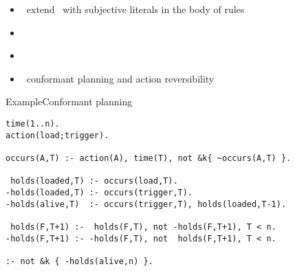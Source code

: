 \begin{frame}{\eclingo}
  \begin{itemize}
  \item {} \ extend \clingo\ with subjective literals in the body of rules
  \item {} \
  \item {} \ \cite{cafagarosc20a}
  \item {} \ conformant planning \cite{cafafa21a} and action reversibility \cite{famoch21a}
  \end{itemize}
\end{frame}
\begin{frame}[fragile]{Example}{Conformant planning}
\begin{lstlisting}[language=clingo,basicstyle=\scriptsize\ttfamily]%,literate={~}{{$\sim$}}1]
time(1..n).
action(load;trigger).

occurs(A,T) :- action(A), time(T), not &k{ ~occurs(A,T) }.

 holds(loaded,T) :- occurs(load,T).
-holds(loaded,T) :- occurs(trigger,T).
-holds(alive,T)  :- occurs(trigger,T), holds(loaded,T-1).

 holds(F,T+1) :-  holds(F,T), not -holds(F,T+1), T < n.
-holds(F,T+1) :- -holds(F,T), not  holds(F,T+1), T < n.

:- not &k { -holds(alive,n) }.
\end{lstlisting}
\end{frame}
%
